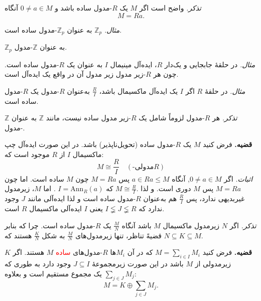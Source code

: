 \hrulefill


\textit{تذکر.} واضح است اگر $M$ یک $R$-مدول ساده باشد و $0 \neq a \in M$ آنگاه
\[
    M = Ra.
\]

\hrulefill

\textit{مثال.} $\mathbb{Z}_p$ به عنوان $\mathbb{Z}_p$-مدول ساده است.

$\mathbb{Z}_p$ به عنوان $\mathbb{Z}$-مدول.

\hrulefill


\textit{مثال.} در حلقهٔ
جابجایی و یک‌دار
$R$، ایده‌آل مینیمال $I$ به عنوان
یک
$R$-مدول
ساده است.
چون هر
$R$-زیر مدول
زیر مدول آن در واقع یک ایده‌آل است.


\hrulefill

\textit{مثال.}
در حلقهٔ
$R$
اگر
$I$
یک ایده‌آل ماکسیمال باشد،
\(\frac{R}{I}\)
به‌عنوان
$R$-مدول
یک
$R$-مدول ساده
است.

\hrulefill


\textit{تذکر.} هر $R$-مدول لزوماً شامل
یک
$R$-زیر مدول
ساده نیست، مانند $\mathbb{Z}$ به عنوان $\mathbb{Z}$-مدول.

\hrulefill

\textbf{قضیه.} فرض کنید $M$ یک $R$-مدول ساده  (تحویل‌ناپذیر) باشد. در این صورت ایده‌آل چپ ماکسیمال $I$ از $R$ موجود است که:
\[
    M \cong \frac{R}{I} \quad (\text{-مدولی}R)
\]
\textit{اثبات.} اگر $0 \neq a \in M$,
آنگاه
\(a \in Ra \leqslant M\)
پس
$M = Ra$
چون
\(M\)
ساده است. اما چون
$M = Ra$
پس
\(M\)
دوری است. و لذا
\(M \cong \frac{R}{I}.\)
که
$I = \mathrm{Ann}_R(a)$ .
اما
\(M\)،
زیرمدول غیربدیهی ندارد، پس
\(\frac{R}{I}\)
هم به‌عنوان
$R$-مدول
ساده است و لذا ایده‌آلی مانند
\(J\)
وجود ندارد که
\(I \lneqq J \lneqq R\)
یعنی
\(I\)
ایده‌آلی ماکسیمال
\(R\)
است.

\hrulefill

\textit{تذکر.} اگر $N$ زیرمدول ماکسیمال $M$ باشد آنگاه $\frac{M}{N}$ یک $R$-مدول ساده است.
چرا که بنابر قضیهً تناظر، تنها زیرمدول‌های $\frac{M}{N}$ به شکل $\frac{K}{N}$ هستند که $N \subseteq K \subseteq M$.

\hrulefill

\textbf{قضیه.} فرض کنید $M = \sum_{i \in I} M_i$ که در آن $M_i$ها $R$-مدول‌های \textcolor{red}{ساده}  \(M\) هستند. اگر $K$ زیرمدولی از $M$ باشد در این صورت زیرمجموعهٔ $J \subseteq I$ وجود دارد به طوری که
\(\sum_{j \in J} M_j\)
یک مجموع مستقیم است و بعلاوه:
\[
    M = K \oplus \sum_{j \in J} M_j.
\]

\hrulefill

